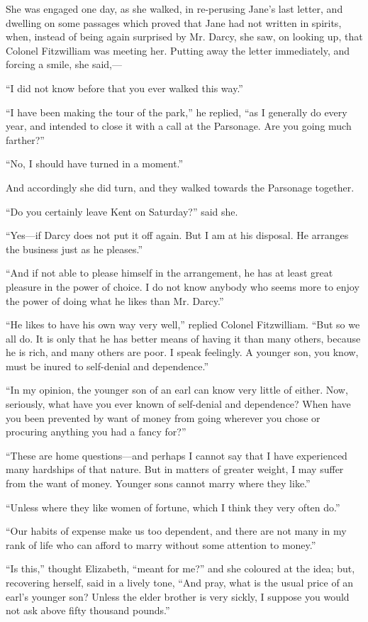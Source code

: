\documentclass[12pt,openright]{book}
\begin{document}
She was engaged one day, as she walked, in re-perusing Jane’s last letter, and dwelling on some passages which proved that Jane had not written in spirits, when, instead of being again surprised by Mr. Darcy, she saw, on looking up, that Colonel Fitzwilliam was meeting her. Putting away the letter immediately, and forcing a smile, she said,—

“I did not know before that you ever walked this way.”

“I have been making the tour of the park,” he replied, “as I generally do every year, and intended to close it with a call at the Parsonage. Are you going much farther?”

“No, I should have turned in a moment.”

And accordingly she did turn, and they walked towards the Parsonage together.

“Do you certainly leave Kent on Saturday?” said she.

“Yes—if Darcy does not put it off again. But I am at his disposal. He arranges the business just as he pleases.”

“And if not able to please himself in the arrangement, he has at least great pleasure in the power of choice. I do not know anybody who seems more to enjoy the power of doing what he likes than Mr. Darcy.”

“He likes to have his own way very well,” replied Colonel Fitzwilliam. “But so we all do. It is only that he has better means of having it than many others, because he is rich, and many others are poor. I speak feelingly. A younger son, you know, must be inured to self-denial and dependence.”

“In my opinion, the younger son of an earl can know very little of either. Now, seriously, what have you ever known of self-denial and dependence? When have you been prevented by want of money from going wherever you chose or procuring anything you had a fancy for?”

“These are home questions—and perhaps I cannot say that I have experienced many hardships of that nature. But in matters of greater weight, I may suffer from the want of money. Younger sons cannot marry where they like.”

“Unless where they like women of fortune, which I think they very often do.”

“Our habits of expense make us too dependent, and there are not many in my rank of life who can afford to marry without some attention to money.”

“Is this,” thought Elizabeth, “meant for me?” and she coloured at the idea; but, recovering herself, said in a lively tone, “And pray, what is the usual price of an earl’s younger son? Unless the elder brother is very sickly, I suppose you would not ask above fifty thousand pounds.”
\end{document}
